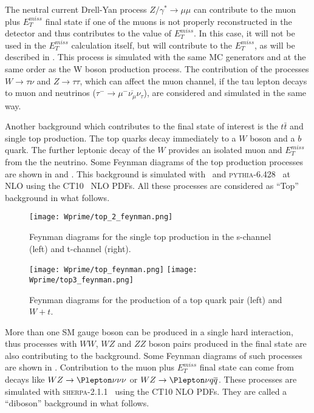 The neutral current Drell-Yan process $Z/\gamma^* \to \mu \mu$ can contribute to the muon plus $E_T^{miss}$ final state if one of the muons is not properly reconstructed in the detector and thus contributes to the value of $E_T^{miss}$. 
In this case, it will not be used in the $E_T^{miss}$ calculation itself, but will contribute to the $E_T^{miss}$, as will be described in .
This process is simulated with the same MC generators and at the same order as the W boson production process.
The contribution of the processes $W \to \tau \nu$ and $Z \to \tau \tau$, which can affect the muon channel, 
if the tau lepton decays to muon and neutrinos ($\tau^{-} \to \mu^{-} \overline{\nu_{\mu}} \nu_{\tau}$), are considered and simulated in the same way.

Another background which contributes to the final state of interest is the $t\bar{t}$ and single top production.
The top quarks decay immediately to a $W$ boson and a $b$ quark. The further leptonic decay of the $W$ provides an isolated muon and $E_T^{miss}$ from the the neutrino.
Some Feynman diagrams of the top production processes are shown in  and .
This background is simulated with \powhegbox\ and {\scshape pythia-6.428}~\cite{Pythia} at NLO using the CT10~\cite{CT10} NLO PDFs.
All these processes are considered as ``Top'' background in what follows.

\begin{figure}[!htb]
  \centering
  \texttt{[image: Wprime/top\_2\_feynman.png]}
  \caption{Feynman diagrams for the single top production in the s-channel (left) and t-channel (right).}
  \label{fig:single_top_feynman}
\end{figure}

\begin{figure}[!htb]
  \centering
  \texttt{[image: Wprime/top\_feynman.png]}
  \texttt{[image: Wprime/top3\_feynman.png]}
  \caption{Feynman diagrams for the production of a top quark pair (left) and $W + t$.}
  \label{fig:top_feynman}
\end{figure}

More than one SM gauge boson can be produced in a single hard interaction, thus processes with $WW$, $WZ$ and $ZZ$ boson pairs produced in the final state are also contributing to the background.
Some Feynman diagrams of such processes are shown in .
Contribution to the muon plus $E_T^{miss}$ final state can come from decays like $WZ \to \Plepton \nu \nu \nu$ or $WZ \to \Plepton \nu q \overline{q}$.
These processes are simulated with {\scshape sherpa-2.1.1}~\cite{Sherpa} using the CT10 NLO PDFs.
They are called a ``diboson'' background in what follows. 

